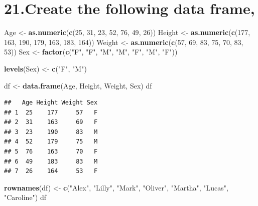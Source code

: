 \documentclass[]{article}
\newenvironment{Shaded}{\begin{snugshade}}{\end{snugshade}}
\newcommand{\DecValTok}[1]{\textcolor[rgb]{0.00,0.00,0.81}{#1}}
\newcommand{\KeywordTok}[1]{\textcolor[rgb]{0.13,0.29,0.53}{\textbf{#1}}}
\newcommand{\NormalTok}[1]{#1}
\newcommand{\StringTok}[1]{\textcolor[rgb]{0.31,0.60,0.02}{#1}}
\begin{document}
\hypertarget{create-the-following-data-frame-1}{%
\section{21.Create the following data
frame,}\label{create-the-following-data-frame-1}}

\begin{Shaded}
\begin{Highlighting}[]
\NormalTok{Age <-}\StringTok{ }\KeywordTok{as.numeric}\NormalTok{(}\KeywordTok{c}\NormalTok{(}\DecValTok{25}\NormalTok{, }\DecValTok{31}\NormalTok{, }\DecValTok{23}\NormalTok{, }\DecValTok{52}\NormalTok{, }\DecValTok{76}\NormalTok{, }\DecValTok{49}\NormalTok{, }\DecValTok{26}\NormalTok{))}
\NormalTok{Height <-}\StringTok{ }\KeywordTok{as.numeric}\NormalTok{(}\KeywordTok{c}\NormalTok{(}\DecValTok{177}\NormalTok{, }\DecValTok{163}\NormalTok{, }\DecValTok{190}\NormalTok{, }\DecValTok{179}\NormalTok{, }\DecValTok{163}\NormalTok{, }\DecValTok{183}\NormalTok{, }\DecValTok{164}\NormalTok{))}
\NormalTok{Weight <-}\StringTok{ }\KeywordTok{as.numeric}\NormalTok{(}\KeywordTok{c}\NormalTok{(}\DecValTok{57}\NormalTok{, }\DecValTok{69}\NormalTok{, }\DecValTok{83}\NormalTok{, }\DecValTok{75}\NormalTok{, }\DecValTok{70}\NormalTok{, }\DecValTok{83}\NormalTok{, }\DecValTok{53}\NormalTok{))}
\NormalTok{Sex <-}\StringTok{ }\KeywordTok{factor}\NormalTok{(}\KeywordTok{c}\NormalTok{(}\StringTok{"F"}\NormalTok{, }\StringTok{"F"}\NormalTok{, }\StringTok{"M"}\NormalTok{, }\StringTok{"M"}\NormalTok{, }\StringTok{"F"}\NormalTok{, }\StringTok{"M"}\NormalTok{, }\StringTok{"F"}\NormalTok{))}

\KeywordTok{levels}\NormalTok{(Sex) <-}\StringTok{ }\KeywordTok{c}\NormalTok{(}\StringTok{"F"}\NormalTok{, }\StringTok{"M"}\NormalTok{)}

\NormalTok{df <-}\StringTok{ }\KeywordTok{data.frame}\NormalTok{(Age, Height, Weight, Sex)}
\NormalTok{df}
\end{Highlighting}
\end{Shaded}

\begin{verbatim}
##   Age Height Weight Sex
## 1  25    177     57   F
## 2  31    163     69   F
## 3  23    190     83   M
## 4  52    179     75   M
## 5  76    163     70   F
## 6  49    183     83   M
## 7  26    164     53   F
\end{verbatim}

\begin{Shaded}
\begin{Highlighting}[]
\KeywordTok{rownames}\NormalTok{(df) <-}\StringTok{ }\KeywordTok{c}\NormalTok{(}\StringTok{"Alex"}\NormalTok{, }\StringTok{"Lilly"}\NormalTok{, }\StringTok{"Mark"}\NormalTok{, }\StringTok{"Oliver"}\NormalTok{, }\StringTok{"Martha"}\NormalTok{, }\StringTok{"Lucas"}\NormalTok{, }\StringTok{"Caroline"}\NormalTok{)}
\NormalTok{df}
\end{Highlighting}
\end{Shaded}
\end{document}
